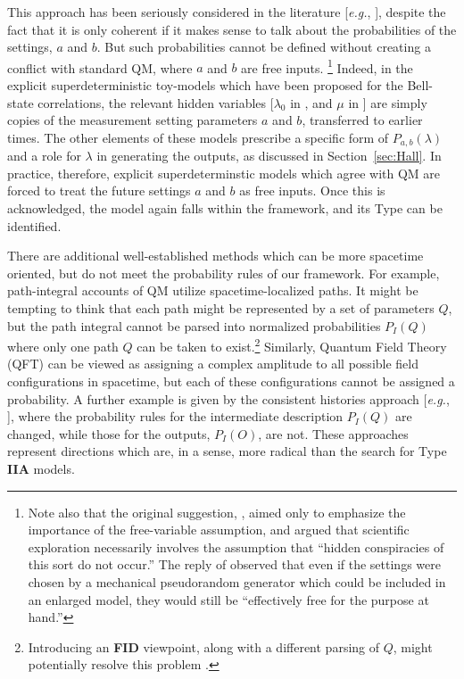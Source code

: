 \documentclass[onecolumn, nofootinbib, 12pt]{revtex4-1}
\begin{document}
This approach has been seriously considered in the literature [\emph{e.g.}, \textcite{thooft2016}], despite the fact that it is only coherent if it makes sense to talk about the probabilities of the settings, $a$ and $b$.  But such probabilities cannot be defined without creating a conflict with standard QM, where $a$ and $b$ are free inputs.%
\footnote{Note also that the original suggestion, \textcite{shimony1976}, aimed only to emphasize the importance of the free-variable assumption, and argued that scientific exploration necessarily involves the assumption that ``hidden conspiracies of this sort do not occur.''  The reply of \textcite{bell1977} observed that even if the settings were chosen by a mechanical pseudorandom generator which could be included in an enlarged model, they would still be ``effectively free for the purpose at hand.''}
Indeed, in the explicit superdeterministic toy-models which have been proposed for the Bell-state correlations, the relevant hidden variables [$\lambda_0$ in \textcite{brans1988}, and $\mu$ in \textcite{hall2016}] are simply copies of the measurement setting parameters $a$ and $b$, transferred to earlier times.  The other elements of these models prescribe a specific form of $P_{a,b}(\lambda)$ and a role for $\lambda$ in generating the outputs, as discussed in Section~\ref{sec:Hall}.  In practice, therefore, explicit superdeterminstic models which agree with QM are forced to treat the future settings $a$ and $b$ as free inputs.  Once this is acknowledged, the model again falls within the framework, and its Type can be identified.

There are additional well-established methods which can be more spacetime oriented, but do not meet the probability rules of our framework.  For example, path-integral accounts of QM utilize spacetime-localized paths.  It might be tempting to think that each path might be represented by a set of parameters $Q$, but the path integral cannot be parsed into normalized probabilities $P_I(Q)$ where only one path $Q$ can be taken to exist.\footnote{Introducing an {\bf FID} viewpoint, along with a different parsing of $Q$, might potentially resolve this problem \cite{wharton2016}.}  Similarly, Quantum Field Theory (QFT) can be viewed as assigning a complex amplitude to all possible field configurations in spacetime, but each of these configurations cannot be assigned a probability.  A further example is given by the consistent histories approach [\emph{e.g.}, \textcite{griffiths2011}], where the probability rules for the intermediate description $P_I(Q)$ are changed, while those for the outputs, $P_I(O)$, are not.  These approaches represent directions which are, in a sense, more radical than the search for Type {\bf IIA} models.
\end{document}
